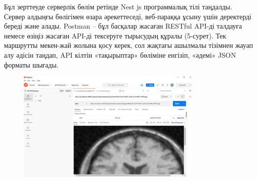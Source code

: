 
Бұл зерттеуде серверлік бөлім ретінде Nest js программалық тілі
таңдалды. Сервер алдыңғы бөлігімен өзара әрекеттеседі, веб-параққа ұсыну
үшін деректерді береді және алады. Postman -- бұл басқалар жасаған
RESTful API-ді талдауға немесе өзіңіз жасаған API-ді тексеруге тырысудың
құралы (5-сурет). Тек маршрутты мекен-жай жолына қосу керек, сол жақтағы
ашылмалы тізімнен жауап алу әдісін таңдап, API кілтін «тақырыптар»
бөліміне енгізіп, «әдемі» JSON форматы шығады.

\begin{figure}[H]
	\centering
	\includegraphics[width=0.8\textwidth]{assets/196}
	\caption*{}
\end{figure}

